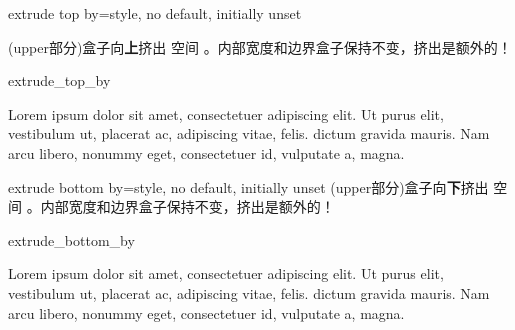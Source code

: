 \begin{docTcbKey}{extrude top by}{=}{style, no default, initially unset}

  (upper部分)盒子向{\bf 上}挤出  空间%
  。内部宽度和边界盒子保持不变，挤出是额外的！
\begin{exdispExample}{extrude_top_by}

Lorem ipsum dolor sit amet, consectetuer adipiscing elit. Ut purus elit,
vestibulum ut, placerat ac, adipiscing vitae, felis.
 dictum gravida mauris.
Nam arcu libero, nonummy eget, consectetuer id, vulputate a, magna.
\end{exdispExample}
\end{docTcbKey}

\begin{docTcbKey}{extrude bottom by}{=}{style, no default, initially unset}
  (upper部分)盒子向{\bf 下}挤出  空间%
  。内部宽度和边界盒子保持不变，挤出是额外的！
\begin{exdispExample}[safety=1cm]{extrude_bottom_by}

Lorem ipsum dolor sit amet, consectetuer adipiscing elit. Ut purus elit,
vestibulum ut, placerat ac, adipiscing vitae, felis.
 dictum gravida mauris.
Nam arcu libero, nonummy eget, consectetuer id, vulputate a, magna.
\end{exdispExample}
\end{docTcbKey}



